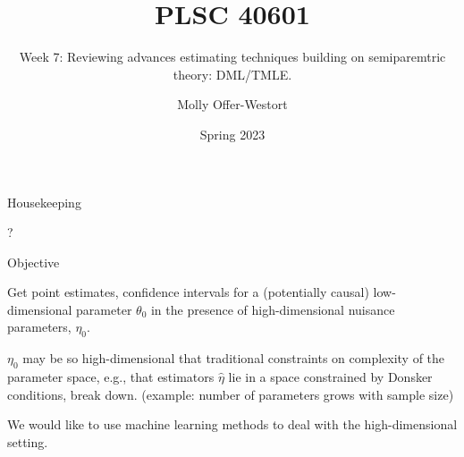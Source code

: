\documentclass[xcolor={table}, handout]{beamer}
\title{PLSC 40601}
\subtitle{Week 7: Reviewing advances estimating techniques building on semiparemtric theory: DML/TMLE.}
\date{Spring 2023}
\author{Molly Offer-Westort}
\institute{Department of Political Science, \\University of Chicago}
\begin{document}




\frame{\titlepage
\thispagestyle{empty}
}
\begin{frame}{Housekeeping}

\begin{wideitemize}
\item ?
\end{wideitemize}

\end{frame}



% 
% 
% 
\begin{frame}{Objective}

\begin{wideitemize}
\item Get point estimates, confidence intervals for a (potentially causal) low-dimensional parameter $\theta_0$ in the presence of high-dimensional nuisance parameters, $\eta_0$.\pause
\item $\eta_0$ may be so high-dimensional that traditional constraints on complexity of the parameter space, e.g., that estimators $\hat\eta$ lie in a space constrained by Donsker conditions,  break down. \pause (example: number of parameters grows with sample size)\pause
\item We would like to use machine learning methods to deal with the high-dimensional setting. 
\end{wideitemize}

\end{frame}
\end{document}

